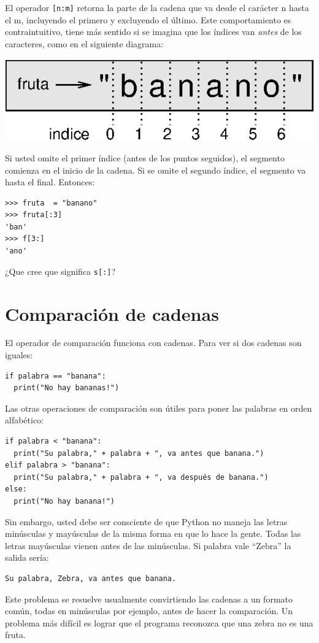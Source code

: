 El operador \texttt{{[}n:m{]}} retorna la parte de la cadena que va
desde el carácter n hasta el m, incluyendo el primero y excluyendo
el último. Este comportamiento es contraintuitivo, tiene más sentido
si se imagina que los índices van {\em antes} de los caracteres,
como en el siguiente diagrama:

\beforefig \centerline{\includegraphics{illustrations/banana}}
\afterfig

Si usted omite el primer índice (antes de los puntos seguidos), el
segmento comienza en el inicio de la cadena. Si se omite el segundo
índice, el segmento va hasta el final. Entonces:
\begin{verbatim}
>>> fruta  = "banano"
>>> fruta[:3]
'ban'
>>> f[3:]
'ano'
\end{verbatim}
 ¿Que cree que significa \texttt{s{[}:{]}}?

\section{Comparación de cadenas}

 

El operador de comparación funciona con cadenas. Para ver si dos cadenas
son iguales:
\begin{verbatim}
if palabra == "banana":
  print("No hay bananas!")
\end{verbatim}
Las otras operaciones de comparación son útiles para poner las palabras
en orden alfabético:
\begin{verbatim}
if palabra < "banana":
  print("Su palabra," + palabra + ", va antes que banana.")
elif palabra > "banana":
  print("Su palabra," + palabra + ", va después de banana.")
else:
  print("No hay banana!")
\end{verbatim}

Sin embargo, usted debe ser consciente de que Python no maneja las
letras minúsculas y mayúsculas de la misma forma en que lo hace la
gente. Todas las letras mayúsculas vienen antes de las minúsculas.
Si palabra vale ``Zebra'' la salida sería:
\begin{verbatim}
Su palabra, Zebra, va antes que banana.
\end{verbatim}
Este problema se resuelve usualmente convirtiendo las cadenas a un
formato común, todas en minúsculas por ejemplo, antes de hacer la
comparación. Un problema más difícil es lograr que el programa reconozca
que una zebra no es una fruta.

